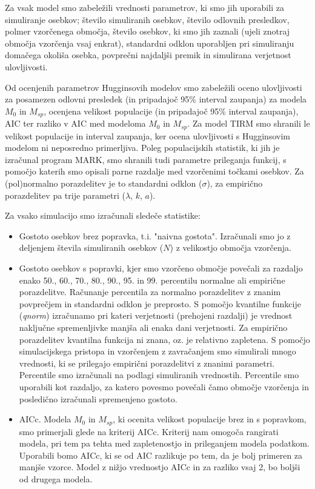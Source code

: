 Za vsak model smo zabeležili vrednosti parametrov, ki smo jih uporabili za simuliranje osebkov; število simuliranih osebkov, število odlovnih presledkov, polmer vzorčenega območja, število osebkov, ki smo jih zaznali (ujeli znotraj območja vzorčenja vsaj enkrat), standardni odklon uporabljen pri simuliranju domačega okoliša osebka, povprečni najdaljši premik in simulirana verjetnost ulovljivosti.

Od ocenjenih parametrov Hugginsovih modelov smo zabeležili oceno ulovljivosti za posamezen odlovni presledek (in pripadajoč 95\% interval zaupanja) za modela $M_0$ in $M_{sp}$, ocenjena velikost populacije (in pripadajoč 95\% interval zaupanja), AIC ter razliko v AIC med modeloma $M_0$ in $M_{sp}$. Za model TIRM smo shranili le velikost populacije in interval zaupanja, ker ocena ulovljivosti s Hugginsovim modelom ni neposredno primerljiva.
Poleg populacijskih statistik, ki jih je izračunal program MARK, smo shranili tudi parametre prileganja funkcij, s pomočjo katerih smo opisali parne razdalje med vzorčenimi točkami osebkov. Za (pol)normalno porazdelitev je to standardni odklon ($\sigma$), za empirično porazdelitev pa trije parametri ($\lambda$, $k$, $a$).

Za vsako simulacijo smo izračunali sledeče statistike:

\begin{itemize}
  \item Gostoto osebkov brez popravka, t.i. "naivna gostota". Izračunali smo jo z deljenjem števila simuliranih osebkov ($N$) z velikostjo območja vzorčenja.
  \item Gostoto osebkov s popravki, kjer smo vzorčeno območje povečali za razdaljo enako 50., 60., 70., 80., 90., 95. in 99. percentilu normalne ali empirične porazdelitve. Računanje percentila za normalno porazdelitev z znanim povprečjem in standardni odklon je preprosto. S pomočjo kvantilne funkcije (\emph{qnorm}) izračunamo pri kateri verjetnosti (prehojeni razdalji) je vrednost naključne spremenljivke manjša ali enaka dani verjetnosti.
  Za empirično porazdelitev kvantilna funkcija ni znana, oz. je relativno zapletena. S pomočjo simulacijskega pristopa in vzorčenjem z zavračanjem smo simulirali mnogo vrednosti, ki se prilegajo empirični porazdelitvi z znanimi parametri. Percentile smo izračunali na podlagi simuliranih vrednostih. Percentile smo uporabili kot razdaljo, za katero povesmo povečali čamo območje vzorčenja in posledično izračunali spremenjeno gostoto.
  \item AICc. Modela $M_0$ in $M_{sp}$, ki ocenita velikost populacije brez in s popravkom, smo primerjali glede na kriterij AICc. Kriterij nam omogoča rangirati modela, pri tem pa tehta med zapletenostjo in prileganjem modela podatkom. Uporabili bomo AICc, ki se od AIC razlikuje po tem, da je bolj primeren za manjše vzorce. Model z nižjo vrednostjo AICc in za razliko vsaj 2, bo boljši od drugega modela.
\end{itemize}

